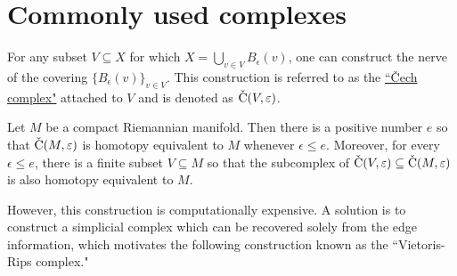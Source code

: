


\section{Commonly used complexes}

\begin{defn}
	For any subset $V\subseteq X$ for which $X = \bigcup_{v\in V}B_\epsilon(v)$, one can construct the nerve of the covering $\{B_\epsilon(v)\}_{v\in V}$. This construction is referred to as the \underline{``\v{C}ech complex"} attached to $V$ and is denoted as $\operatorname{\check{C}}(V,\varepsilon)$.
\end{defn}

\begin{thm}
Let $M$ be a compact Riemannian manifold. Then there is a positive number $e$ so that $\operatorname{\check{C}}(M, \varepsilon)$ is homotopy equivalent to $M$ whenever $\epsilon \leq e$. Moreover, for every $ \epsilon \leq e$, there is a finite subset $V \subseteq M$ so that the subcomplex of $\operatorname{\check{C}}(V,\varepsilon) \subseteq \operatorname{\check{C}}(M, \varepsilon)$ is also homotopy equivalent to $M$.
\end{thm}

However, this construction is computationally expensive. A solution is to construct a simplicial complex which can be recovered solely from the edge information, which motivates the following construction known as the ``Vietoris-Rips complex." 

